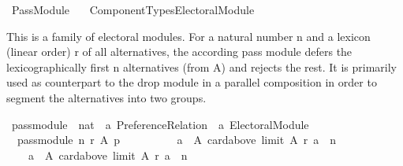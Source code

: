 %
\begin{isabellebody}%
%
%
\isadelimdocument
\isanewline
%
\endisadelimdocument
%
\isatagdocument
\isanewline
\isanewline
%
\isamarkuptrue%
%
\endisatagdocument
{\isafolddocument}%
%
\isadelimdocument
%
\endisadelimdocument
%
\isadelimtheory
%
\endisadelimtheory
%
\isatagtheory
{}\isamarkupfalse%
\ Pass{\isacharunderscore}{\kern0pt}Module\isanewline
\ \ \ {\isachardoublequoteopen}Component{\isacharunderscore}{\kern0pt}Types{\isacharslash}{\kern0pt}Electoral{\isacharunderscore}{\kern0pt}Module{\isachardoublequoteclose}\isanewline
{}%
\endisatagtheory
{\isafoldtheory}%
%
\isadelimtheory
%
\endisadelimtheory
%
\begin{isamarkuptext}%
This is a family of electoral modules. For a natural number n and a
lexicon (linear order) r of all alternatives, the according pass module
defers the lexicographically first n alternatives (from A) and rejects
the rest. It is primarily used as counterpart to the drop module in a
parallel composition in order to segment the alternatives into two groups.%
\end{isamarkuptext}\isamarkuptrue%
%
\isadelimdocument
%
\endisadelimdocument
%
\isatagdocument
%
\isamarkuptrue%
%
\endisatagdocument
{\isafolddocument}%
%
\isadelimdocument
%
\endisadelimdocument
{}\isamarkupfalse%
\ pass{\isacharunderscore}{\kern0pt}module\ {\isacharcolon}{\kern0pt}{\isacharcolon}{\kern0pt}\ {\isachardoublequoteopen}nat\ {\isasymRightarrow}\ {\isacharprime}{\kern0pt}a\ Preference{\isacharunderscore}{\kern0pt}Relation\ {\isasymRightarrow}\ {\isacharprime}{\kern0pt}a\ Electoral{\isacharunderscore}{\kern0pt}Module{\isachardoublequoteclose}\ \isanewline
\ \ {\isachardoublequoteopen}pass{\isacharunderscore}{\kern0pt}module\ n\ r\ A\ p\ {\isacharequal}{\kern0pt}\isanewline
\ \ \ \ {\isacharparenleft}{\kern0pt}{\isacharbraceleft}{\kern0pt}{\isacharbraceright}{\kern0pt}{\isacharcomma}{\kern0pt}\isanewline
\ \ \ \ {\isacharbraceleft}{\kern0pt}a\ {\isasymin}\ A{\isachardot}{\kern0pt}\ card{\isacharparenleft}{\kern0pt}above\ {\isacharparenleft}{\kern0pt}limit\ A\ r{\isacharparenright}{\kern0pt}\ a{\isacharparenright}{\kern0pt}\ {\isachargreater}{\kern0pt}\ n{\isacharbraceright}{\kern0pt}{\isacharcomma}{\kern0pt}\isanewline
\ \ \ \ {\isacharbraceleft}{\kern0pt}a\ {\isasymin}\ A{\isachardot}{\kern0pt}\ card{\isacharparenleft}{\kern0pt}above\ {\isacharparenleft}{\kern0pt}limit\ A\ r{\isacharparenright}{\kern0pt}\ a{\isacharparenright}{\kern0pt}\ {\isasymle}\ n{\isacharbraceright}{\kern0pt}{\isacharparenright}{\kern0pt}{\isachardoublequoteclose}%

\end{isabellebody}
